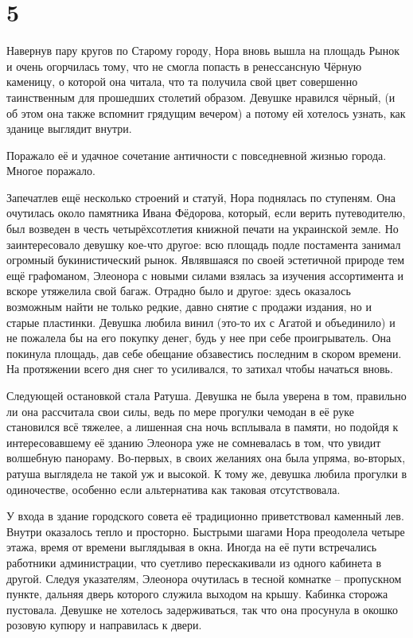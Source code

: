 \documentclass[
  a5paperpaper,
  DIV=11,
  numbers=noendperiod]{scrreprt}
\begin{document}
\section*{5}\label{5}


Навернув пару кругов по Старому городу, Нора вновь вышла на площадь
Рынок и очень огорчилась тому, что не смогла попасть в ренессансную
Чёрную каменицу, о которой она читала, что та получила свой цвет
совершенно таинственным для прошедших столетий образом. Девушке нравился
чёрный, (и об этом она также вспомнит грядущим вечером) а потому ей
хотелось узнать, как зданице выглядит внутри.

Поражало её и удачное сочетание античности с повседневной жизнью города.
Многое поражало.

Запечатлев ещё несколько строений и статуй, Нора поднялась по ступеням.
Она очутилась около памятника Ивана Фёдорова, который, если верить
путеводителю, был возведен в честь четырёхсотлетия книжной печати на
украинской земле. Но заинтересовало девушку кое-что другое: всю площадь
подле постамента занимал огромный букинистический рынок. Являвшаяся по
своей эстетичной природе тем ещё графоманом, Элеонора с новыми силами
взялась за изучения ассортимента и вскоре утяжелила свой багаж. Отрадно
было и другое: здесь оказалось возможным найти не только редкие, давно
снятие с продажи издания, но и старые пластинки. Девушка любила винил
(это-то их с Агатой и объединило) и не пожалела бы на его покупку денег,
будь у нее при себе проигрыватель. Она покинула площадь, дав себе
обещание обзавестись последним в скором времени. На протяжении всего дня
снег то усиливался, то затихал чтобы начаться вновь.

Следующей остановкой стала Ратуша. Девушка не была уверена в том,
правильно ли она рассчитала свои силы, ведь по мере прогулки чемодан в
её руке становился всё тяжелее, а лишенная сна ночь всплывала в памяти,
но подойдя к интересовавшему её зданию Элеонора уже не сомневалась в
том, что увидит волшебную панораму. Во-первых, в своих желаниях она была
упряма, во-вторых, ратуша выглядела не такой уж и высокой. К тому же,
девушка любила прогулки в одиночестве, особенно если альтернатива как
таковая отсутствовала.

У входа в здание городского совета её традиционно приветствовал каменный
лев. Внутри оказалось тепло и просторно. Быстрыми шагами Нора преодолела
четыре этажа, время от времени выглядывая в окна. Иногда на её пути
встречались работники администрации, что суетливо перескакивали из
одного кабинета в другой. Следуя указателям, Элеонора очутилась в тесной
комнатке -- пропускном пункте, дальняя дверь которого служила выходом на
крышу. Кабинка сторожа пустовала. Девушке не хотелось задерживаться, так
что она просунула в окошко розовую купюру и направилась к двери.
\end{document}
